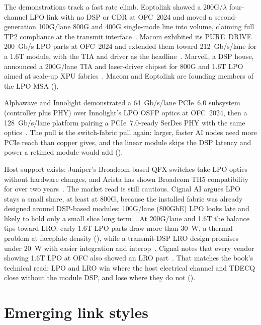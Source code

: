 The demonstrations track a fast rate climb. Eoptolink showed a
200G/$\lambda$ four-channel LPO link with no DSP or CDR at OFC~2024 and moved a
second-generation 100G/lane 800G and 400G single-mode line into volume, claiming
full TP2 compliance at the transmit interface~\cite{eoptolinklpo}. Macom exhibited its
PURE~DRIVE 200~Gb/s LPO parts at OFC~2024 and extended them toward
212~Gb/s/lane for a 1.6T module, with the TIA and driver as the headline~\cite{macomlpo}. Marvell,
a DSP house, announced a 200G/lane TIA and laser-driver chipset for 800G and 1.6T
LPO aimed at scale-up XPU fabrics~\cite{marvelllpo}. Macom and Eoptolink are founding
members of the LPO MSA ().

 Alphawave and Innolight demonstrated
a 64~Gb/s/lane PCIe~6.0 subsystem (controller plus PHY) over Innolight's LPO OSFP
optics at OFC~2024, then a 128~Gb/s/lane platform pairing a PCIe~7.0-ready SerDes
PHY with the same optics~\cite{alphawavelpo}. The pull is the switch-fabric pull again:
larger, faster AI nodes need more PCIe reach than copper gives, and the linear
module skips the DSP latency and power a retimed module would add
().

 Host support exists:
Juniper's Broadcom-based QFX switches take LPO optics without hardware changes, and
Arista has shown Broadcom TH5 compatibility for over two years~\cite{lpo}. The
market read is still cautious. Cignal AI argues LPO stays a small share, at least
at 800G, because the installed fabric was already designed around DSP-based
modules; 100G/lane (800GbE) LPO looks late and likely to hold only a small slice
long term~. At 200G/lane and 1.6T the balance tips toward LRO:
early 1.6T LPO parts draw more than 30~W, a thermal problem at faceplate density
(), while a transmit-DSP LRO design promises under 20~W
with easier integration and interop~\cite{lpo}. Cignal notes that every vendor
showing 1.6T LPO at OFC also showed an LRO part~. That matches
the book's technical read: LPO and LRO win where the host electrical channel and
TDECQ close without the module DSP, and lose where they do not
().

\section{Emerging link styles}

